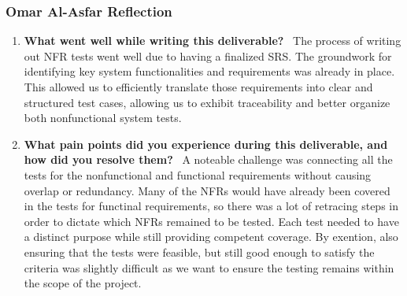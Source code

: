 \documentclass[12pt, titlepage]{article}
\begin{document}
\subsubsection*{Omar Al-Asfar Reflection}
\begin{enumerate}
\item \textbf{What went well while writing this deliverable?} \
The process of writing out NFR tests went well due to having a finalized SRS. The groundwork for identifying key system functionalities and requirements was already in place. This allowed us to efficiently translate those requirements into clear and structured test cases, allowing us to exhibit traceability and better organize both nonfunctional system tests.

\item \textbf{What pain points did you experience during this deliverable, and how did you resolve them?} \
A noteable challenge was connecting all the tests for the nonfunctional and functional requirements without causing overlap or redundancy. Many of the NFRs would have already been covered in the tests for functinal requirements, so there was a lot of retracing steps in order to dictate which NFRs remained to be tested. Each test needed to have a distinct purpose while still providing competent coverage. By exention, also ensuring that the tests were feasible, but still good enough to satisfy the criteria was slightly difficult as we want to ensure the testing remains within the scope of the project.
\end{enumerate}
\end{document}
